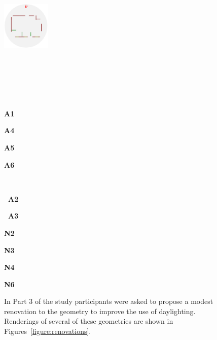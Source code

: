 \begin{figure}[t]
\begin{minipage}[c]{4.9in}
  \includegraphics[width=0.9in]{../gi2012_userstudy/images/section3/9_2D_walls_rotate} %
\end{minipage}
\vspace{-1.12in}
\\
\begin{minipage}{1.65in}~\end{minipage}
\begin{minipage}{1.65in}~\end{minipage}
\begin{minipage}{0.9in}{\bf A1}\end{minipage}
\begin{minipage}{0.9in}{\bf A4}\end{minipage}
\begin{minipage}{0.88in}{\bf A5}\end{minipage}
\begin{minipage}{0.88in}{\bf A6}\end{minipage}%
\vspace{0.68in}
\\
\begin{minipage}{1.65in}{\bf ~A2}\end{minipage}
\begin{minipage}{1.65in}{\bf ~A3}\end{minipage}
\begin{minipage}{0.9in}{\bf N2}\end{minipage}
\begin{minipage}{0.9in}{\bf N3}\end{minipage}
\begin{minipage}{0.88in}{\bf N4}\end{minipage}
\begin{minipage}{0.88in}{\bf N6}\end{minipage}\vspace{0.0in}%
  \caption{ In Part 3 of the study participants were asked to propose
    a modest renovation to the geometry to improve the use of
    daylighting.
Renderings of several of these geometries are shown
in
Figures~\ref{figure:renovations}.
  }
\label{figure:improved_designs}
\vspace{-0.1in}
\end{figure}
